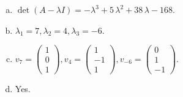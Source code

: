 \begin{questions}
\begin{solution}
\begin{enumerate}[(a)]
\item $\det(A-\lambda I)=-{\lambda}^{3} + 5 \, {\lambda}^{2} + 38 \, {\lambda} - 168$.
\item ${\lambda}_1=7, {\lambda}_2=4, {\lambda}_3=-6$.
\item $v_{7}=\left(\begin{array}{r}
1 \\
0 \\
1
\end{array}\right), v_{4}=\left(\begin{array}{r}
1 \\
-1 \\
1
\end{array}\right), v_{-6}=\left(\begin{array}{r}
0 \\
1 \\
-1
\end{array}\right)$.
\item Yes.
\end{enumerate}
\end{solution}

\end{questions}

\newpage


\begin{center}
\end{center}

